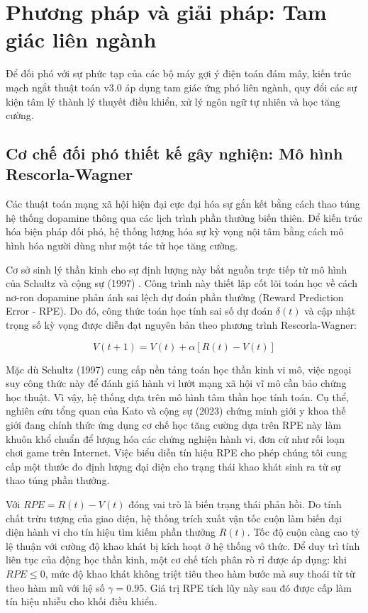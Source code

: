\section{Phương pháp và giải pháp: Tam giác liên ngành}

Để đối phó với sự phức tạp của các bộ máy gợi ý điện toán đám mây, kiến trúc mạch ngắt thuật toán v3.0 áp dụng tam giác ứng phó liên ngành, quy đổi các sự kiện tâm lý thành lý thuyết điều khiển, xử lý ngôn ngữ tự nhiên và học tăng cường.

\subsection{Cơ chế đối phó thiết kế gây nghiện: Mô hình Rescorla-Wagner}

Các thuật toán mạng xã hội hiện đại cực đại hóa sự gắn kết bằng cách thao túng hệ thống dopamine thông qua các lịch trình phần thưởng biến thiên. Để kiến trúc hóa biện pháp đối phó, hệ thống lượng hóa sự kỳ vọng nội tâm bằng cách mô hình hóa người dùng như một tác tử học tăng cường.

Cơ sở sinh lý thần kinh cho sự định lượng này bắt nguồn trực tiếp từ mô hình của Schultz và cộng sự (1997) \cite{schultz1997}. Công trình này thiết lập cốt lõi toán học về cách nơ-ron dopamine phản ánh sai lệch dự đoán phần thưởng (Reward Prediction Error - RPE). Do đó, công thức toán học tính sai số dự đoán $\delta(t)$ và cập nhật trọng số kỳ vọng được diễn đạt nguyên bản theo phương trình Rescorla-Wagner:

\begin{equation}
    V(t+1) = V(t) + \alpha [R(t) - V(t)]
\end{equation}

Mặc dù Schultz (1997) cung cấp nền tảng toán học thần kinh vi mô, việc ngoại suy công thức này để đánh giá hành vi lướt mạng xã hội vĩ mô cần bảo chứng học thuật. Vì vậy, hệ thống dựa trên mô hình tâm thần học tính toán. Cụ thể, nghiên cứu tổng quan của Kato và cộng sự (2023) \cite{kato2023} chứng minh giới y khoa thế giới đang chính thức ứng dụng cơ chế học tăng cường dựa trên RPE này làm khuôn khổ chuẩn để lượng hóa các chứng nghiện hành vi, đơn cử như rối loạn chơi game trên Internet. Việc biểu diễn tín hiệu RPE cho phép chúng tôi cung cấp một thước đo định lượng đại diện cho trạng thái khao khát sinh ra từ sự thao túng phần thưởng.

Với $RPE = R(t) - V(t)$ đóng vai trò là biến trạng thái phản hồi. Do tính chất trừu tượng của giao diện, hệ thống trích xuất vận tốc cuộn làm biến đại diện hành vi cho tín hiệu tìm kiếm phần thưởng $R(t)$. Tốc độ cuộn càng cao tỷ lệ thuận với cường độ khao khát bị kích hoạt ở hệ thống vô thức. Để duy trì tính liên tục của động học thần kinh, một cơ chế tích phân rò rỉ được áp dụng: khi $RPE \le 0$, mức độ khao khát không triệt tiêu theo hàm bước mà suy thoái từ từ theo hàm mũ với hệ số $\gamma = 0.95$. Giá trị RPE tích lũy này sau đó được cấp làm tín hiệu nhiễu cho khối điều khiển.


